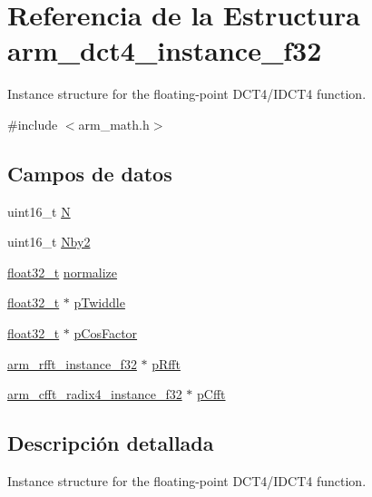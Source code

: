 \hypertarget{structarm__dct4__instance__f32}{}\section{Referencia de la Estructura arm\+\_\+dct4\+\_\+instance\+\_\+f32}
\label{structarm__dct4__instance__f32}


Instance structure for the floating-\/point D\+C\+T4/\+I\+D\+C\+T4 function.  




{\ttfamily \#include $<$arm\+\_\+math.\+h$>$}

\subsection*{Campos de datos}
\begin{DoxyCompactItemize}
\item 
uint16\+\_\+t \hyperlink{structarm__dct4__instance__f32_a37d49571fe35012087153c093705cd11}{N}
\item 
uint16\+\_\+t \hyperlink{structarm__dct4__instance__f32_afa64b1618089e35c2b55cff71cb29715}{Nby2}
\item 
\hyperlink{arm__math_8h_a4611b605e45ab401f02cab15c5e38715}{float32\+\_\+t} \hyperlink{structarm__dct4__instance__f32_a1bf2ed86ef2c3dd83af606bb3f520f2a}{normalize}
\item 
\hyperlink{arm__math_8h_a4611b605e45ab401f02cab15c5e38715}{float32\+\_\+t} $\ast$ \hyperlink{structarm__dct4__instance__f32_aca581481fccdff0f557f54a3ef20d967}{p\+Twiddle}
\item 
\hyperlink{arm__math_8h_a4611b605e45ab401f02cab15c5e38715}{float32\+\_\+t} $\ast$ \hyperlink{structarm__dct4__instance__f32_abd73b9d7fb4951ba086e4820c2a48eb0}{p\+Cos\+Factor}
\item 
\hyperlink{structarm__rfft__instance__f32}{arm\+\_\+rfft\+\_\+instance\+\_\+f32} $\ast$ \hyperlink{structarm__dct4__instance__f32_ad4cd7c85eea3f7c5fff4630bbd979e6a}{p\+Rfft}
\item 
\hyperlink{structarm__cfft__radix4__instance__f32}{arm\+\_\+cfft\+\_\+radix4\+\_\+instance\+\_\+f32} $\ast$ \hyperlink{structarm__dct4__instance__f32_ab7bd4d374a1780dea50efd3e7ac220be}{p\+Cfft}
\end{DoxyCompactItemize}


\subsection{Descripción detallada}
Instance structure for the floating-\/point D\+C\+T4/\+I\+D\+C\+T4 function. 

